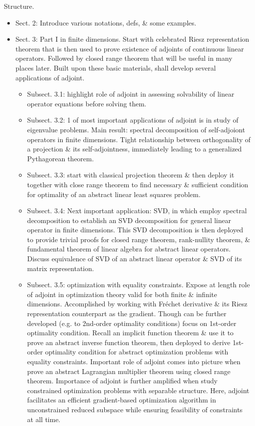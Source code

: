 \documentclass{article}
\begin{document}
\begin{enumerate}
\begin{itemize}
		{\sf Structure.}
		\begin{itemize}
			\item Sect. 2: Introduce various notations, defs, \& some examples.
			\item Sect. 3: Part I in finite dimensions. Start with celebrated Riesz representation theorem that is then used to prove existence of adjoints of continuous linear operators. Followed by closed range theorem that will be useful in many places later. Built upon these basic materials, shall develop several applications of adjoint.
			\begin{itemize}
				\item Subsect. 3.1: highlight role of adjoint in assessing solvability of linear operator equations before solving them.
				\item Subsect. 3.2: 1 of most important applications of adjoint is in study of eigenvalue problems. Main result: spectral decomposition of self-adjoiont operators in finite dimensions. Tight relationship between orthogonality of a projection \& its self-adjointness, immediately leading to a generalized Pythagorean theorem.
				\item Subsect. 3.3: start with classical projection theorem \& then deploy it together with close range theorem to find necessary \& sufficient condition for optimality of an abstract linear least squares problem.
				\item Subsect. 3.4: Next important application: SVD, in which employ spectral decomposition to establish an SVD decomposition for general linear operator in finite dimensions. This SVD decomposition is then deployed to provide trivial proofs for closed range theorem, rank-nullity theorem, \& fundamental theorem of linear algebra for abstract linear operators. Discuss equivalence of SVD of an abstract linear operator \& SVD of its matrix representation.
				\item Subsect. 3.5: optimization with equality constraints. Expose at length role of adjoint in optimization theory valid for both finite \& infinite dimensions. Accomplished by working with Fr\'echet derivative \& its Riesz representation counterpart as the gradient. Though can be further developed (e.g. to 2nd-order optimality conditions) focus on 1st-order optimality condition. Recall an implicit function theorem \& use it to prove an abstract inverse function theorem, then deployed to derive 1st-order optimality condition for abstract optimization problems with equality constraints. Important role of adjoint comes into picture when prove an abstract Lagrangian multiplier theorem using closed range theorem. Importance of adjoint is further amplified when study constrained optimization problems with separable structure. Here, adjoint facilitates an efficient gradient-based optimization algorithm in unconstrained reduced subspace while ensuring feasibility of constraints at all time.

\end{itemize}
\end{itemize}
\end{itemize}
\end{enumerate}
\end{document}
